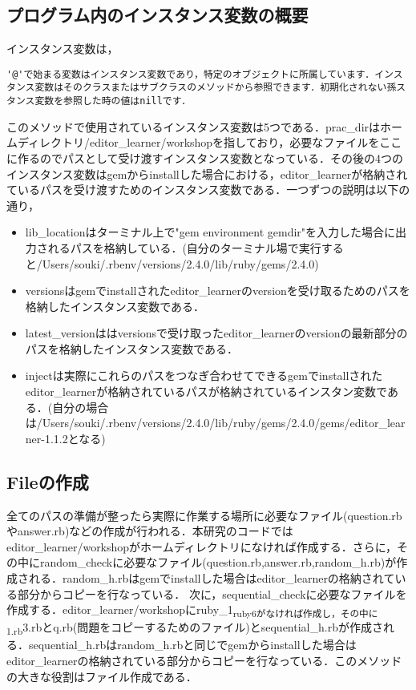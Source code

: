 \subsection{プログラム内のインスタンス変数の概要}\label{ux30d7ux30edux30b0ux30e9ux30e0ux5185ux306eux30a4ux30f3ux30b9ux30bfux30f3ux30b9ux5909ux6570ux306eux6982ux8981}

インスタンス変数は，

\begin{verbatim}
'@'で始まる変数はインスタンス変数であり，特定のオブジェクトに所属しています．インスタンス変数はそのクラスまたはサブクラスのメソッドから参照できます．初期化されない孫スタンス変数を参照した時の値はnillです．
\end{verbatim}

このメソッドで使用されているインスタンス変数は5つである．prac\_dirはホームディレクトリ/editor\_learner/workshopを指しており，必要なファイルをここに作るのでパスとして受け渡すインスタンス変数となっている．その後の4つのインスタンス変数はgemからinstallした場合における，editor\_learnerが格納されているパスを受け渡すためのインスタンス変数である．一つずつの説明は以下の通り，

\begin{itemize}
\tightlist
\item
  lib\_locationはターミナル上で"gem environment
  gemdir"を入力した場合に出力されるパスを格納している．(自分のターミナル場で実行すると/Users/souki/.rbenv/versions/2.4.0/lib/ruby/gems/2.4.0)
\item
  versionsはgemでinstallされたeditor\_learnerのversionを受け取るためのパスを格納したインスタンス変数である．
\item
  latest\_versionははversionsで受け取ったeditor\_learnerのversionの最新部分のパスを格納したインスタンス変数である．
\item
  injectは実際にこれらのパスをつなぎ合わせてできるgemでinstallされたeditor\_learnerが格納されているパスが格納されているインスタン変数である．(自分の場合は/Users/souki/.rbenv/versions/2.4.0/lib/ruby/gems/2.4.0/gems/editor\_learner-1.1.2となる)
\end{itemize}

\subsection{Fileの作成}\label{fileux306eux4f5cux6210}

全てのパスの準備が整ったら実際に作業する場所に必要なファイル(question.rbやanswer.rb)などの作成が行われる．本研究のコードではeditor\_learner/workshopがホームディレクトリになければ作成する．さらに，その中にrandom\_checkに必要なファイル(question.rb,answer.rb,random\_h.rb)が作成される．random\_h.rbはgemでinstallした場合はeditor\_learnerの格納されている部分からコピーを行なっている．
次に，sequential\_checkに必要なファイルを作成する．editor\_learner/workshopにruby\_1\textsubscript{ruby6がなければ作成し，その中に1.rb}3.rbとq.rb(問題をコピーするためのファイル)とsequential\_h.rbが作成される．sequential\_h.rbはrandom\_h.rbと同じでgemからinstallした場合はeditor\_learnerの格納されている部分からコピーを行なっている．このメソッドの大きな役割はファイル作成である．

